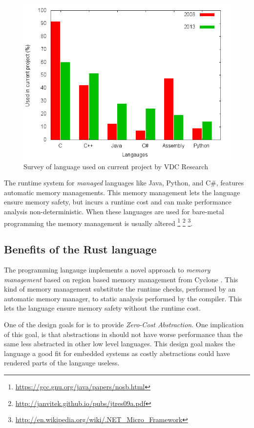 \begin{figure}[H]
  \begin{center}
    \includegraphics[scale=0.5]{figures/plots/langs.png}
  \end{center}
  \caption{Survey of language used on current project by VDC Research}
  \label{fig:vdc:langs}
\end{figure}

The runtime system for \emph{managed} languages like Java, Python, and C\#, features automatic memory managements.
This memory management lets the language ensure memory safety, but incurs a runtime cost and can make performance analysis non-deterministic.
When these languages are used for bare-metal programming the memory management is usually altered \footnote{\url{https://gcc.gnu.org/java/papers/nosb.html}} \footnote{\url{http://janvitek.github.io/pubs/jtres09a.pdf}} \footnote{\url{http://en.wikipedia.org/wiki/.NET_Micro_Framework}}.

\subsection{Benefits of the Rust language}
The {\rust} programming langauge implements a novel approach to \emph{memory management} based on region based memory management from Cyclone \cite{Grossman2002,Swamy2006}.
This kind of memory management substitute the runtime checks, performed by an automatic memory manager, to static analysis performed by the compiler.
This lets the {\rust} language ensure memory safety without the runtime cost.

One of the design goals for {\rust} is to provide \emph{Zero-Cost Abstraction}.
One implication of this goal, is that abstractions in {\rust} should not have worse performance than the same less abstracted in other low level languages.
This design goal makes the language a good fit for embedded systems as costly abstractions could have rendered parts of the langauge useless.

